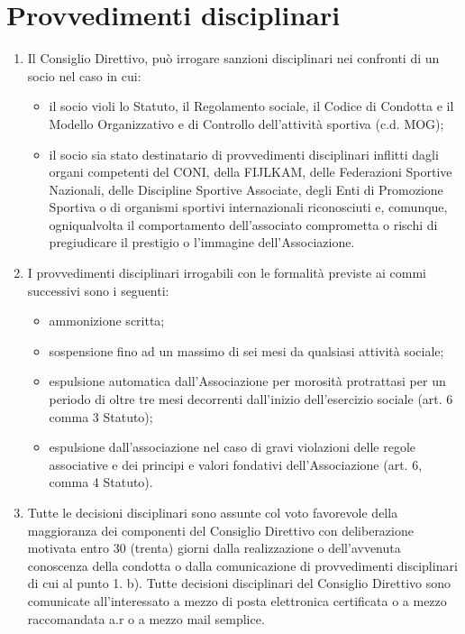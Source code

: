 \documentclass{djtsasddoc}
\begin{document}
	\section{Provvedimenti disciplinari}
	\begin{enumerate}
		\item Il Consiglio Direttivo, può irrogare sanzioni disciplinari nei confronti di un socio nel caso in cui:
		\begin{itemize}
			\item il socio violi lo Statuto,  il Regolamento sociale, il Codice di Condotta e il Modello Organizzativo e di Controllo dell'attività sportiva (c.d. MOG);
			\item il socio sia stato destinatario di provvedimenti disciplinari inflitti dagli organi competenti del CONI, della FIJLKAM, delle Federazioni Sportive Nazionali, delle Discipline Sportive Associate, degli Enti di Promozione Sportiva o di organismi sportivi internazionali riconosciuti e, comunque, ogniqualvolta il comportamento dell'associato comprometta o rischi di pregiudicare il prestigio o l'immagine dell'Associazione.
		\end{itemize}
		\item I provvedimenti disciplinari irrogabili con le formalità previste ai commi successivi sono i seguenti:
		\begin{itemize}
			\item ammonizione scritta;
			\item sospensione fino ad un massimo di sei mesi da qualsiasi attività sociale;
			\item espulsione automatica dall'Associazione per morosità protrattasi per un periodo di oltre tre mesi decorrenti dall'inizio dell'esercizio sociale (art. 6 comma 3 Statuto);
			\item espulsione dall'associazione nel caso di gravi violazioni delle regole associative e dei principi e valori fondativi dell'Associazione (art. 6, comma 4 Statuto). 
		\end{itemize}
		\item Tutte le decisioni disciplinari sono assunte col voto favorevole della maggioranza dei componenti del Consiglio Direttivo con deliberazione motivata entro 30 (trenta) giorni dalla realizzazione o dell'avvenuta conoscenza della condotta o dalla comunicazione di provvedimenti disciplinari di cui al punto 1. b). Tutte  decisioni disciplinari  del Consiglio Direttivo sono comunicate all'interessato a mezzo di posta elettronica certificata o a mezzo raccomandata a.r o a mezzo mail semplice.

\end{enumerate}
\end{document}
